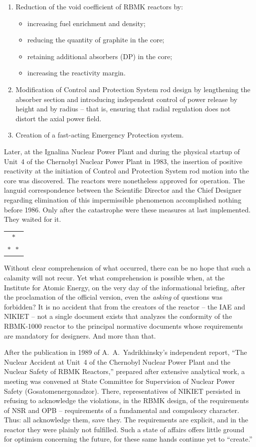 \documentclass[openright]{bookest}
\newcommand{\varthreestars}{\begin{center}\begin{tabular}{c}$\ast$\\[-0.8ex] $\ast\enspace \ast $\end{tabular}\end{center}}
\begin{document}
\begin{enumerate}
\item Reduction of the void coefficient of RBMK reactors by:
\begin{itemize}
  \item increasing fuel enrichment and density;
  \item reducing the quantity of graphite in the core;
  \item retaining additional absorbers (DP) in the core;
  \item increasing the reactivity margin.
\end{itemize}

\item Modification of Control and Protection System rod design by lengthening the absorber section and introducing independent control of power release by height and by radius -- that is, ensuring that radial regulation does not distort the axial power field.

\item Creation of a fast-acting Emergency Protection system.
\end{enumerate}

Later, at the Ignalina Nuclear Power Plant and during the physical startup of Unit~4 of the Chernobyl Nuclear Power Plant in 1983, the insertion of positive reactivity at the initiation of Control and Protection System rod motion into the core was discovered. The reactors were nonetheless approved for operation. The languid correspondence between the Scientific Director and the Chief Designer regarding elimination of this impermissible phenomenon accomplished nothing before 1986. Only after the catastrophe were these measures at last implemented. They waited for it.

\varthreestars

Without clear comprehension of what occurred, there can be no hope that such a calamity will not recur. Yet what comprehension is possible when, at the Institute for Atomic Energy, on the very day of the informational briefing, after the proclamation of the official version, even the \textit{asking} of questions was forbidden? It is no accident that from the creators of the reactor -- the IAE and NIKIET -- not a single document exists that analyzes the conformity of the RBMK-1000 reactor to the principal normative documents whose requirements are mandatory for designers. And more than that.

After the publication in 1989 of A.~A.~Yadrikhinsky's independent report, ``The Nuclear Accident at Unit~4 of the Chernobyl Nuclear Power Plant and the Nuclear Safety of RBMK Reactors,'' prepared after extensive analytical work, a meeting was convened at State Committee for Supervision of Nuclear Power Safety (Gosatomenergonadzor). There, representatives of NIKIET persisted in refusing to acknowledge the violations, in the RBMK design, of the requirements of NSR and OPB -- requirements of a fundamental and compulsory character. Thus: all acknowledge them, save they. The requirements are explicit, and in the reactor they were plainly not fulfilled. Such a state of affairs offers little ground for optimism concerning the future, for these same hands continue yet to ``create.''
\end{document}
